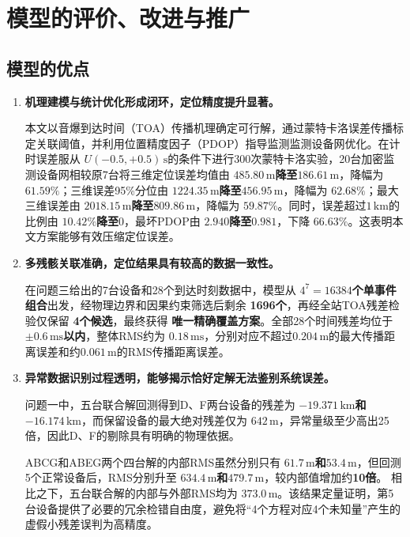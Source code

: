 \documentclass[draft,12pt,a4paper]{ctexart}
\theoremstyle{definition}
\begin{document}
\section{模型的评价、改进与推广}

\subsection{模型的优点}

\begin{enumerate}[label=\arabic*.]

\item \textbf{机理建模与统计优化形成闭环，定位精度提升显著。}

本文以音爆到达时间（TOA）传播机理确定可行解，通过蒙特卡洛误差传播标定关联阈值，并利用位置精度因子（PDOP）指导监测监测设备网优化。在计时误差服从
$U(-0.5,+0.5)\,\mathrm{s}$的条件下进行300次蒙特卡洛实验，20台加密监测设备网相较原7台将三维定位误差均值由
\textbf{$485.80\,\mathrm{m}$降至$186.61\,\mathrm{m}$}，降幅为
\textbf{$61.59\%$}；三维误差95\%分位由
\textbf{$1224.35\,\mathrm{m}$降至$456.95\,\mathrm{m}$}，降幅为
\textbf{$62.68\%$}；最大三维误差由
\textbf{$2018.15\,\mathrm{m}$降至$809.86\,\mathrm{m}$}，降幅为
\textbf{$59.87\%$}。同时，误差超过$1\,\mathrm{km}$的比例由
\textbf{$10.42\%$降至$0$}，最坏PDOP由
\textbf{$2.940$降至$0.981$}，下降
\textbf{$66.63\%$}。这表明本文方案能够有效压缩定位误差。

\item \textbf{多残骸关联准确，定位结果具有较高的数据一致性。}

在问题三给出的7台设备和28个到达时刻数据中，模型从
\textbf{$4^7=16384$个单事件组合}出发，经物理边界和因果约束筛选后剩余
\textbf{1696个}，再经全站TOA残差检验仅保留
\textbf{4个候选}，最终获得
\textbf{唯一精确覆盖方案}。全部28个时间残差均位于
\textbf{$\pm0.6\,\mathrm{ms}$以内}，整体RMS约为
\textbf{$0.18\,\mathrm{ms}$}，分别对应不超过$0.204\,\mathrm{m}$的最大传播距离误差和约$0.061\,\mathrm{m}$的RMS传播距离误差。


\item \textbf{异常数据识别过程透明，能够揭示恰好定解无法鉴别系统误差。}

问题一中，五台联合解回测得到D、F两台设备的残差为
\textbf{$-19.371\,\mathrm{km}$和$-16.174\,\mathrm{km}$}，而保留设备的最大绝对残差仅为
\textbf{$642\,\mathrm{m}$}，异常量级至少高出25倍，因此D、F的剔除具有明确的物理依据。

ABCG和ABEG两个四台解的内部RMS虽然分别只有
\textbf{$61.7\,\mathrm{m}$和$53.4\,\mathrm{m}$}，但回测5个正常设备后，RMS分别升至
\textbf{$634.4\,\mathrm{m}$和$479.7\,\mathrm{m}$}，较内部值增加约\textbf{10倍}。
相比之下，五台联合解的内部与外部RMS均为
\textbf{$373.0\,\mathrm{m}$}。该结果定量证明，第5台设备提供了必要的冗余检错自由度，避免将“4个方程对应4个未知量”产生的虚假小残差误判为高精度。



\end{enumerate}
\end{document}
